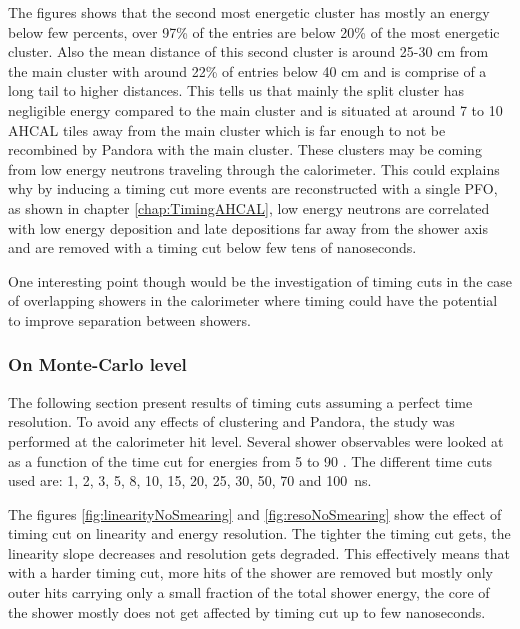 The figures shows that the second most energetic cluster has mostly an energy below few percents, over 97\% of the entries are below 20\% of the most energetic cluster. Also the mean distance of this second cluster is around 25-30 cm from the main cluster with around 22\% of entries below 40 cm and is comprise of a long tail to higher distances. This tells us that mainly the split cluster has negligible energy compared to the main cluster and is situated at around 7 to 10 AHCAL tiles away from the main cluster which is far enough to not be recombined by Pandora with the main cluster. These clusters may be coming from low energy neutrons traveling through the calorimeter. This could explains why by inducing a timing cut more events are reconstructed with a single PFO, as shown in chapter \ref{chap:TimingAHCAL}, low energy neutrons are correlated with low energy deposition and late depositions far away from the shower axis and are removed with a timing cut below few tens of nanoseconds.

One interesting point though would be the investigation of timing cuts in the case of overlapping showers in the calorimeter where timing could have the potential to improve separation between showers.

\subsubsection{On Monte-Carlo level}
\label{sec:MCLevelILDTiming}

The following section present results of timing cuts assuming a perfect time resolution. To avoid any effects of clustering and Pandora, the study was performed at the calorimeter hit level. Several shower observables were looked at as a function of the time cut for energies from 5 \GeV to 90 \GeV \kzeroL. The different time cuts used are: 1, 2, 3, 5, 8, 10, 15, 20, 25, 30, 50, 70 and \SI{100}{\nano\second}.

The figures \ref{fig:linearityNoSmearing} and \ref{fig:resoNoSmearing} show the effect of timing cut on linearity and energy resolution. The tighter the timing cut gets, the linearity slope decreases and resolution gets degraded. This effectively means that with a harder timing cut, more hits of the shower are removed but mostly only outer hits carrying only a small fraction of the total shower energy, the core of the shower mostly does not get affected by timing cut up to few nanoseconds.


